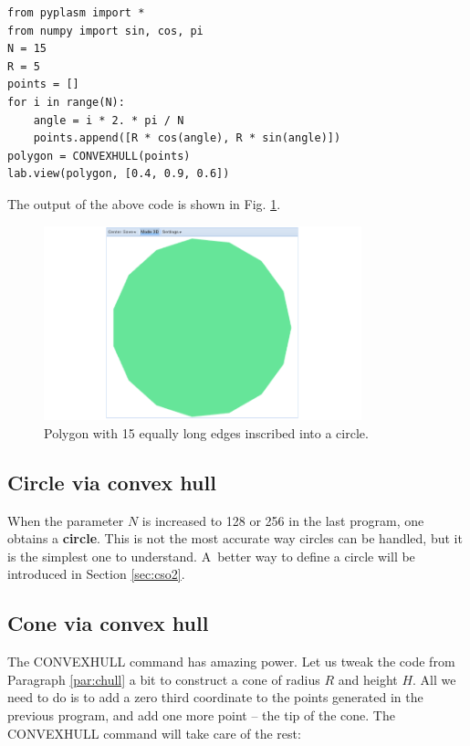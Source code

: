 \documentclass[article,A4,12pt]{llncs}
\begin{document}
\begin{verbatim}
from pyplasm import *
from numpy import sin, cos, pi
N = 15
R = 5
points = []
for i in range(N):
    angle = i * 2. * pi / N
    points.append([R * cos(angle), R * sin(angle)])
polygon = CONVEXHULL(points)
lab.view(polygon, [0.4, 0.9, 0.6])
\end{verbatim}
The output of the above code is shown in Fig. \ref{fig:convexhull-1}.

\newpage

\begin{figure}[!ht]
\begin{center}
\includegraphics[width=0.82\textwidth]{img/convexhull-1.png}
\end{center}
\vspace{-2mm}
\caption{Polygon with 15 equally long edges inscribed into a circle.}
\label{fig:convexhull-1}
\end{figure}

\subsection{Circle via convex hull}\label{par:cico}

When the parameter $N$ is increased to 128 or 256 in the last program, 
one obtains a {\bf circle}. This is not the most accurate way circles 
can be handled, but it is the simplest one to understand. A~better way to 
define a circle will be introduced in Section \ref{sec:cso2}. 
 

\subsection{Cone via convex hull}\label{par:coco}

The CONVEXHULL command has amazing power. Let us tweak the code
from Paragraph \ref{par:chull} a bit to construct a cone of radius
$R$ and height $H$. All we need to do is to add a zero third coordinate 
to the points generated in the previous program, and add one more 
point -- the tip of the cone. The CONVEXHULL command will take care 
of the rest:
\end{document}
